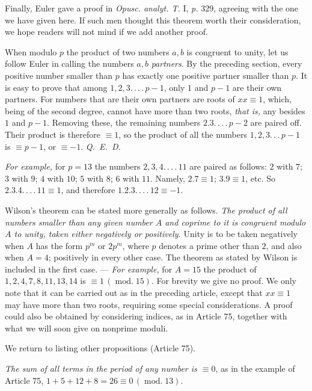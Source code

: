 Finally, Euler gave a proof in \emph{Opusc. analyt. T.} I, \emph{p.} 329, agreeing with the one we have given here. If such men thought this theorem worth their consideration, we hope readers will not mind if we add another proof.

When modulo $p$ the product of two numbers $a,b$ is congruent to unity, let us follow Euler in calling the numbers $a,b$ \emph{partners}. By the preceding section, every positive number smaller than $p$ has exactly one positive partner smaller than $p$. It is easy to prove that among $1,2,3\mathpunct{.\,.\,.\,.}\,p-1$, only $1$ and $p-1$ are their own partners. For numbers that are their own partners are roots of $xx\equiv1$, which, being of the second degree, cannot have more than two roots, \emph{that is,} any besides $1$ and $p-1$. Removing these, the remaining numbers $2.3\mathpunct{.\,.\,.\,.}\,p-2$ are paired off. Their product is therefore $\equiv1$, so the product of all the numbers $1,2,3\mathpunct{.\,.\,.}\,p-1$ is $\equiv p-1$, or $\equiv-1$. \mbox{\emph{Q. E. D.}}

\emph{For example,} for $p=13$ the numbers $2,3,4\mathpunct{.\,.\,.\,.}\,11$ are paired as follows: $2$ with $7$; $3$ with $9$; $4$ with $10$; $5$ with $8$; $6$ with $11$. Namely, $2.7\equiv1$; $3.9\equiv1$, etc. So $2.3.4\mathpunct{.\,.\,.\,.}\,11\equiv1$, and therefore $1.2.3\mathpunct{.\,.\,.\,.}\,12\equiv-1$.

Wilson’s theorem can be stated more generally as follows. \emph{The product of all numbers smaller than any given number $A$ and coprime to it is congruent modulo $A$ to unity, taken either negatively or positively.} Unity is to be taken negatively when $A$ has the form $p^m$ or $2p^m$, where $p$ denotes a
prime other than $2$, and also when $A=4$; positively in every other case. The theorem as stated by Wilson is included in the first case. --- \emph{For example,} for $A=15$ the product of $1,2,4,7,8,11,13,14$ is $\equiv1\,(\operatorname{mod.}15)$. For brevity we give no proof. We only note that it can be carried out as in the preceding article, except that $xx\equiv1$ may have more than two roots, requiring some special considerations. A proof could also be obtained by considering indices, as in Article 75, together with what we will soon give on nonprime moduli.

We return to listing other propositions (Article 75).

\emph{The sum of all terms in the period of any number is $\equiv0$}, as in the example of Article 75, $1+5+12+8=26\equiv0\,(\operatorname{mod.}13)$.

